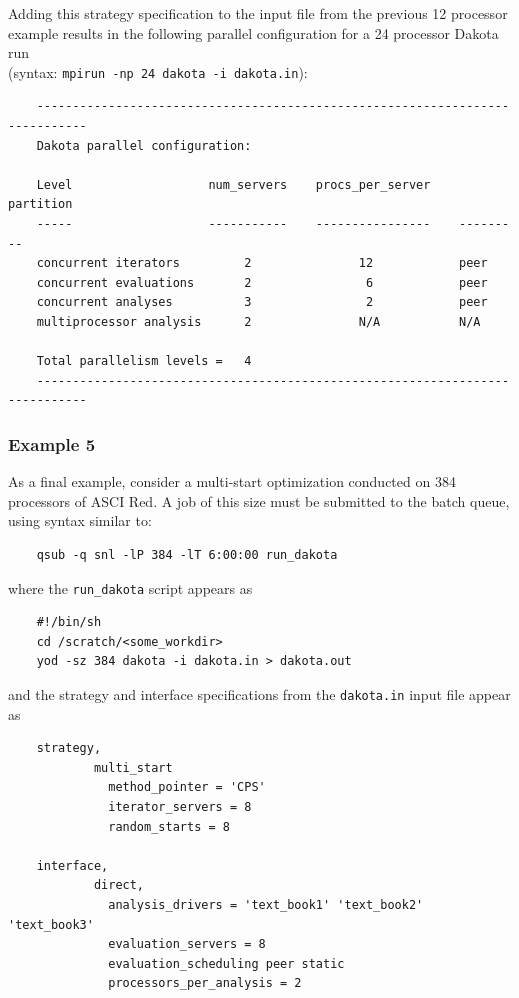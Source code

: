 Adding this strategy specification to the input file from the previous
12 processor example results in the following parallel configuration
for a 24 processor Dakota run \\
(syntax: \texttt{mpirun -np 24 dakota -i dakota.in}):
\begin{small}
\begin{verbatim}
    -----------------------------------------------------------------------------
    Dakota parallel configuration:

    Level                   num_servers    procs_per_server    partition
    -----                   -----------    ----------------    ---------
    concurrent iterators         2               12            peer
    concurrent evaluations       2                6            peer
    concurrent analyses          3                2            peer
    multiprocessor analysis      2               N/A           N/A

    Total parallelism levels =   4
    -----------------------------------------------------------------------------
\end{verbatim}
\end{small}

\subsubsection{Example 5}\label{parallel:spec:multi:example5}

As a final example, consider a multi-start optimization conducted on
384 processors of ASCI Red. A job of this size must be submitted to
the batch queue, using syntax similar to:
\begin{small}
\begin{verbatim}
    qsub -q snl -lP 384 -lT 6:00:00 run_dakota
\end{verbatim}
\end{small}

where the \texttt{run\_dakota} script appears as
\begin{small}
\begin{verbatim}
    #!/bin/sh
    cd /scratch/<some_workdir>
    yod -sz 384 dakota -i dakota.in > dakota.out
\end{verbatim}
\end{small}

and the strategy and interface specifications from the
\texttt{dakota.in} input file appear as
\begin{small}
\begin{verbatim}
    strategy,
            multi_start
              method_pointer = 'CPS'
              iterator_servers = 8
              random_starts = 8

    interface,
            direct,
              analysis_drivers = 'text_book1' 'text_book2' 'text_book3'
              evaluation_servers = 8
              evaluation_scheduling peer static
              processors_per_analysis = 2
\end{verbatim}
\end{small}

